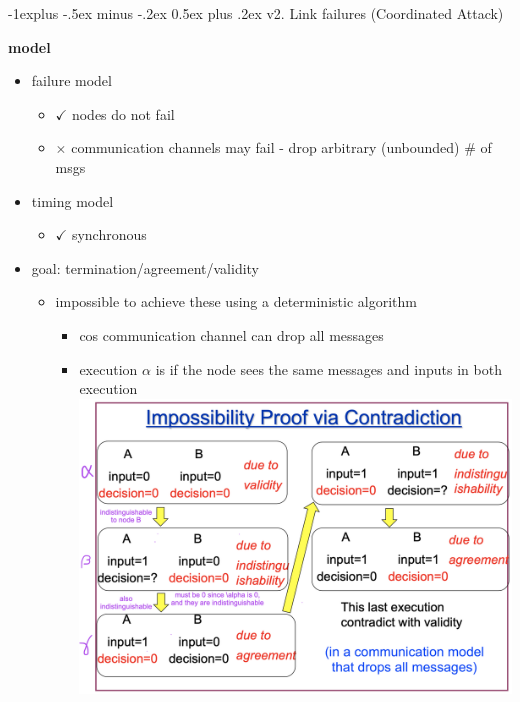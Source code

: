 \documentclass[10pt, landscape]{article}
\makeatletter
\renewcommand{\subsection}{\@startsection{subsection}{2}{0mm}%
  {-1explus -.5ex minus -.2ex}%
  {0.5ex plus .2ex}%
{\normalfont\normalsize\bfseries}}
\makeatother
\begin{document}
\begin{multicols*}{3}
  \subsection{v2. Link failures (Coordinated Attack)}

  \textbf{model}

  \begin{itemize}
    \item failure model
      \begin{itemize}
        \item $\checkmark$ nodes do not fail
        \item $\times$ communication channels may fail
          - drop arbitrary (unbounded) \# of msgs
      \end{itemize}
    \item timing model
      \begin{itemize}
        \item $\checkmark$ synchronous
      \end{itemize}
    \item goal: termination/agreement/validity
      \begin{itemize}
        \item impossible to achieve these using a deterministic algorithm
          \begin{itemize}
            \item cos communication channel can drop all messages
            \item execution $\alpha$ is  if the node sees the same messages and inputs in both execution
              \includegraphics[width=0.8\linewidth]{cs4231-distributedconsensus-v2-impossibility.png} 
          \end{itemize}
      \end{itemize}
  \end{itemize}


\end{multicols*}
\end{document}

